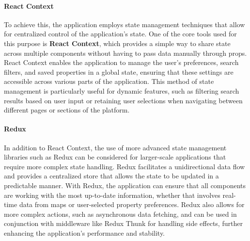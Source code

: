     \paragraph{React Context}
    To achieve this, the application employs state management techniques that allow for centralized control of the application’s state. One of the core tools used for this purpose is \textbf{React Context}, which provides a simple way to share state across multiple components without having to pass data manually through props. React Context enables the application to manage the user’s preferences, search filters, and saved properties in a global state, ensuring that these settings are accessible across various parts of the application. This method of state management is particularly useful for dynamic features, such as filtering search results based on user input or retaining user selections when navigating between different pages or sections of the platform.
    \newline
    \paragraph{Redux}
    In addition to React Context, the use of more advanced state management libraries such as Redux can be considered for larger-scale applications that require more complex state handling. Redux facilitates a unidirectional data flow and provides a centralized store that allows the state to be updated in a predictable manner. With Redux, the application can ensure that all components are working with the most up-to-date information, whether that involves real-time data from maps or user-selected property preferences. Redux also allows for more complex actions, such as asynchronous data fetching, and can be used in conjunction with middleware like Redux Thunk for handling side effects, further enhancing the application’s performance and stability.
    